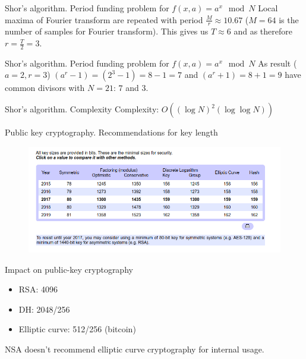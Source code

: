 \documentclass[10pt,pdf,hyperref={unicode}]{beamer}
\begin{document}
\begin{frame}{Shor's algorithm. Period funding problem for
  $f\left(x, a\right) = a^x \mod{N}$}
  Local maxima of Fourier transform are repeated with period
  $\frac{M}{r} \approx 10.67$ ($M = 64$ is the number of samples for
  Fourier transform). This gives us $T\approx 6$ and as therefore
  $r=\frac{T}{2}=3$.
\end{frame}


\begin{frame}{Shor's algorithm. Period funding problem for
    $f\left(x, a\right) = a^x \mod{N}$}
  As result ($a = 2, r = 3$)
  $(a^r-1) = (2^3 -1) = 8 - 1 = 7$ and $(a^r + 1) = 8 + 1=  9$ have common divisors with
  $N=21$: $7$ and $3$.
\end{frame}

\begin{frame}{Shor's algorithm. Complexity}
  Complexity: $O\!\left((\log N)^{2}(\log \log N)\right)$
\end{frame}


\begin{frame}{Public key cryptography. Recommendations for key length}
 \begin{figure} 
   \includegraphics[width=120mm,scale=0.5]{keylengthcom.png}
  \end{figure}
\end{frame}

\begin{frame}{Impact on public-key cryptography}
\begin{itemize}
\item RSA: 4096
\item DH: 2048/256
\item Elliptic curve: 512/256 (bitcoin) 
\end{itemize}

NSA doesn't recommend elliptic curve cryptography for internal usage.
\end{frame}

\end{document}
